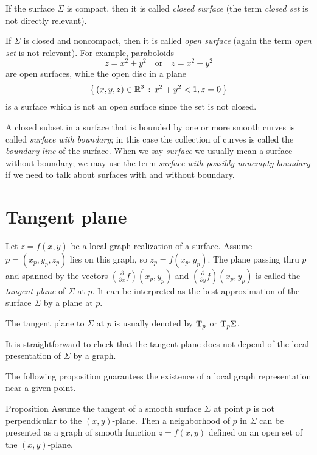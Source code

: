 If the surface $\Sigma$ is compact, then it is called \emph{closed surface} (the term \emph{closed set} is not directly relevant).

If $\Sigma$ is closed and noncompact, then it is called  \emph{open surface} (again the term \emph{open set} is not relevant).
For example, paraboloids 
\[z=x^2+y^2\quad\text{or}\quad z=x^2-y^2\]
are open surfaces, while the
open disc in a plane 
\[\left\{\,{(x,y,z)\in\mathbb{R}^3}\,:\,{x^2+y^2<1, z=0}\,\right\}\]
is a surface which is not an open surface since the set is not closed. 

A closed subset in a surface that is bounded by one or more smooth curves is called \emph{surface with boundary}; in this case the collection of curves is called the \emph{boundary line} of the surface.
When we say \emph{surface} we usually mean a surface without boundary;
we may use the term \emph{surface with possibly nonempty boundary} if we need to talk about surfaces with and without boundary.

\section{Tangent plane}

Let $z=f(x,y)$ be a local graph realization of a surface. 
Assume $p=(x_p,y_p,z_p)$ lies on this graph, so $z_p=f(x_p,y_p)$.
The plane passing thru $p$ and spanned by the vectors $(\tfrac{\partial}{\partial x}f)(x_p,y_p)$ and  $(\tfrac{\partial}{\partial y}f)(x_p,y_p)$ is called the \emph{tangent plane} of $\Sigma$ at $p$.
It can be interpreted as the best approximation of the surface $\Sigma$ by a plane at $p$.

The tangent plane to $\Sigma$ at $p$ is usually denoted by $\mathrm{T}_p$ or $\mathrm{T}_p\Sigma$.

It is straightforward to check that the tangent plane does not depend of the local presentation of $\Sigma$ by a graph.

The following proposition guarantees the existence of a local graph representation near a given point.

\begin{thm}{Proposition}\label{prop:perp}
Assume the tangent of a smooth surface $\Sigma$ at point $p$ is not perpendicular to the $(x,y)$-plane.
Then a neighborhood of $p$ in $\Sigma$ can be presented as a graph of smooth function $z=f(x,y)$ defined on an open set of the $(x,y)$-plane.
\end{thm}

